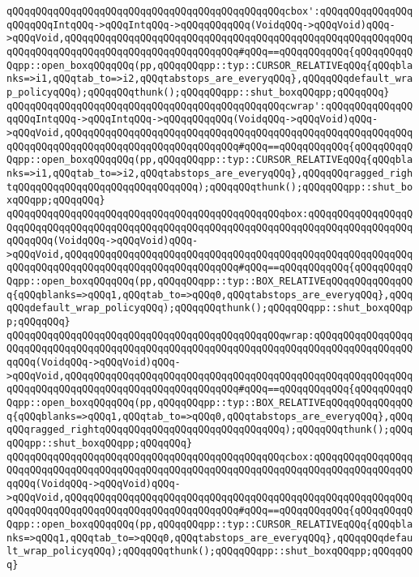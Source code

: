 \verb|qQQqqQQqqQQqqQQqqQQqqQQqqQQqqQQqqQQqqQQqqQQqqQQqcbox':qQQqqQQqqQQqqQQqqQQqqQQqIntqQQq->qQQqIntqQQq->qQQqqQQqqQQq(VoidqQQq->qQQqVoid)qQQq->qQQqVoid,qQQqqQQqqQQqqQQqqQQqqQQqqQQqqQQqqQQqqQQqqQQqqQQqqQQqqQQqqQQqqQQqqQQqqQQqqQQqqQQqqQQqqQQqqQQqqQQqqQQq#qQQq==qQQqqQQqqQQq{qQQqqQQqqQQqpp::open_boxqQQqqQQq(pp,qQQqqQQqpp::typ::CURSOR_RELATIVEqQQq{qQQqblanks=>i1,qQQqtab_to=>i2,qQQqtabstops_are_everyqQQq},qQQqqQQqdefault_wrap_policyqQQq);qQQqqQQqthunk();qQQqqQQqpp::shut_boxqQQqpp;qQQqqQQq}|\newline
\verb|qQQqqQQqqQQqqQQqqQQqqQQqqQQqqQQqqQQqqQQqqQQqqQQqcwrap':qQQqqQQqqQQqqQQqqQQqIntqQQq->qQQqIntqQQq->qQQqqQQqqQQq(VoidqQQq->qQQqVoid)qQQq->qQQqVoid,qQQqqQQqqQQqqQQqqQQqqQQqqQQqqQQqqQQqqQQqqQQqqQQqqQQqqQQqqQQqqQQqqQQqqQQqqQQqqQQqqQQqqQQqqQQqqQQqqQQq#qQQq==qQQqqQQqqQQq{qQQqqQQqqQQqpp::open_boxqQQqqQQq(pp,qQQqqQQqpp::typ::CURSOR_RELATIVEqQQq{qQQqblanks=>i1,qQQqtab_to=>i2,qQQqtabstops_are_everyqQQq},qQQqqQQqragged_rightqQQqqQQqqQQqqQQqqQQqqQQqqQQqqQQq);qQQqqQQqthunk();qQQqqQQqpp::shut_boxqQQqpp;qQQqqQQq}|\newline
\newline
\verb|qQQqqQQqqQQqqQQqqQQqqQQqqQQqqQQqqQQqqQQqqQQqqQQqbox:qQQqqQQqqQQqqQQqqQQqqQQqqQQqqQQqqQQqqQQqqQQqqQQqqQQqqQQqqQQqqQQqqQQqqQQqqQQqqQQqqQQqqQQqqQQqqQQq(VoidqQQq->qQQqVoid)qQQq->qQQqVoid,qQQqqQQqqQQqqQQqqQQqqQQqqQQqqQQqqQQqqQQqqQQqqQQqqQQqqQQqqQQqqQQqqQQqqQQqqQQqqQQqqQQqqQQqqQQqqQQqqQQq#qQQq==qQQqqQQqqQQq{qQQqqQQqqQQqpp::open_boxqQQqqQQq(pp,qQQqqQQqpp::typ::BOX_RELATIVEqQQqqQQqqQQqqQQq{qQQqblanks=>qQQq1,qQQqtab_to=>qQQq0,qQQqtabstops_are_everyqQQq},qQQqqQQqdefault_wrap_policyqQQq);qQQqqQQqthunk();qQQqqQQqpp::shut_boxqQQqpp;qQQqqQQq}|\newline
\verb|qQQqqQQqqQQqqQQqqQQqqQQqqQQqqQQqqQQqqQQqqQQqqQQqwrap:qQQqqQQqqQQqqQQqqQQqqQQqqQQqqQQqqQQqqQQqqQQqqQQqqQQqqQQqqQQqqQQqqQQqqQQqqQQqqQQqqQQqqQQqqQQq(VoidqQQq->qQQqVoid)qQQq->qQQqVoid,qQQqqQQqqQQqqQQqqQQqqQQqqQQqqQQqqQQqqQQqqQQqqQQqqQQqqQQqqQQqqQQqqQQqqQQqqQQqqQQqqQQqqQQqqQQqqQQqqQQq#qQQq==qQQqqQQqqQQq{qQQqqQQqqQQqpp::open_boxqQQqqQQq(pp,qQQqqQQqpp::typ::BOX_RELATIVEqQQqqQQqqQQqqQQq{qQQqblanks=>qQQq1,qQQqtab_to=>qQQq0,qQQqtabstops_are_everyqQQq},qQQqqQQqragged_rightqQQqqQQqqQQqqQQqqQQqqQQqqQQqqQQq);qQQqqQQqthunk();qQQqqQQqpp::shut_boxqQQqpp;qQQqqQQq}|\newline
\verb|qQQqqQQqqQQqqQQqqQQqqQQqqQQqqQQqqQQqqQQqqQQqqQQqcbox:qQQqqQQqqQQqqQQqqQQqqQQqqQQqqQQqqQQqqQQqqQQqqQQqqQQqqQQqqQQqqQQqqQQqqQQqqQQqqQQqqQQqqQQqqQQq(VoidqQQq->qQQqVoid)qQQq->qQQqVoid,qQQqqQQqqQQqqQQqqQQqqQQqqQQqqQQqqQQqqQQqqQQqqQQqqQQqqQQqqQQqqQQqqQQqqQQqqQQqqQQqqQQqqQQqqQQqqQQqqQQq#qQQq==qQQqqQQqqQQq{qQQqqQQqqQQqpp::open_boxqQQqqQQq(pp,qQQqqQQqpp::typ::CURSOR_RELATIVEqQQq{qQQqblanks=>qQQq1,qQQqtab_to=>qQQq0,qQQqtabstops_are_everyqQQq},qQQqqQQqdefault_wrap_policyqQQq);qQQqqQQqthunk();qQQqqQQqpp::shut_boxqQQqpp;qQQqqQQq}|\newline
